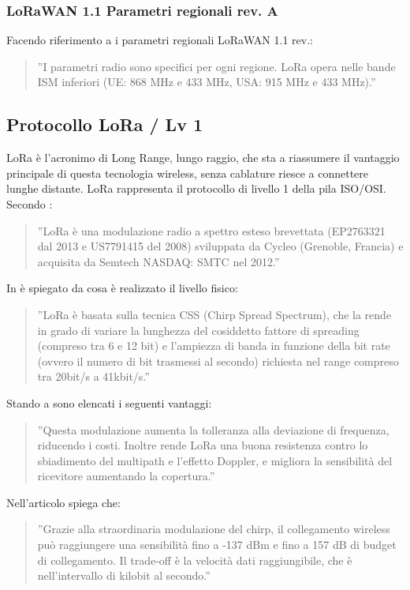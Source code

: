 \documentclass[a4paper]{report} %
\begin{document}
\subsubsection{LoRaWAN 1.1 Parametri regionali rev. A}
Facendo riferimento a \cite{art:rif.29} i parametri regionali LoRaWAN 1.1 rev.:
\begin{quote}
	''I parametri radio sono specifici per ogni regione. LoRa opera nelle bande ISM inferiori (UE: 868 MHz e 433 MHz, USA: 915 MHz e 433 MHz).''
\end{quote}

\subsection{Protocollo LoRa / Lv 1}
LoRa è l'acronimo di Long Range, lungo raggio, che sta a riassumere il vantaggio principale di questa tecnologia wireless, senza cablature riesce a connettere lunghe distante. LoRa rappresenta il protocollo di livello 1 della pila ISO/OSI. Secondo \cite{art:rif.30}:
\begin{quote}
	''LoRa è una modulazione radio a spettro esteso brevettata (EP2763321 dal 2013 e US7791415 del 2008) sviluppata da Cycleo (Grenoble, Francia) e acquisita da Semtech NASDAQ: SMTC nel 2012.''
\end{quote}
In \cite{art:rif.23} è spiegato da cosa è realizzato il livello fisico:
\begin{quote}
	''LoRa è basata sulla tecnica CSS (Chirp Spread Spectrum), che la rende in grado di variare la lunghezza del cosiddetto fattore di spreading (compreso tra 6 e 12 bit) e l'ampiezza di banda in funzione della bit rate (ovvero il numero di bit trasmessi al secondo) richiesta nel range compreso tra 20bit/s a 41kbit/s.''
\end{quote}
Stando a \cite{art:rif.44} sono elencati i seguenti vantaggi:
\begin{quote}
	''Questa modulazione aumenta la tolleranza alla deviazione di frequenza, riducendo i costi. Inoltre rende LoRa una buona resistenza contro lo sbiadimento del multipath e l'effetto Doppler, e migliora la sensibilità del ricevitore aumentando la copertura.''
\end{quote}
Nell'articolo \cite{art:rif.30} spiega che:
\begin{quote}
	''Grazie alla straordinaria modulazione del chirp, il collegamento wireless può raggiungere una sensibilità fino a -137 dBm e fino a 157 dB di budget di collegamento. Il trade-off è la velocità dati raggiungibile, che è nell'intervallo di kilobit al secondo.''
\end{quote}
\end{document}
